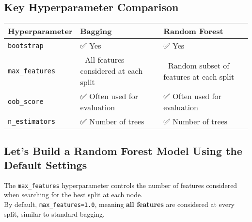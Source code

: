 \documentclass[
  letterpaper,
  DIV=11,
  numbers=noendperiod]{scrreprt}
\begin{document}
\subsection{Key Hyperparameter
Comparison}\label{key-hyperparameter-comparison}

\begin{longtable}[]{@{}
  >{\raggedright\arraybackslash}p{}
  >{\raggedright\arraybackslash}p{}
  >{\raggedright\arraybackslash}p{}@{}}
\toprule\noalign{}
\begin{minipage}[b]{\linewidth}\raggedright
Hyperparameter
\end{minipage} & \begin{minipage}[b]{\linewidth}\raggedright
\textbf{Bagging}
\end{minipage} & \begin{minipage}[b]{\linewidth}\raggedright
\textbf{Random Forest}
\end{minipage} \\
\midrule\noalign{}
\endhead
\bottomrule\noalign{}
\endlastfoot
\texttt{bootstrap} & ✅ Yes & ✅ Yes \\
\texttt{max\_features} & 🧩 All features considered at each split & 🧩
Random subset of features at each split \\
\texttt{oob\_score} & ✅ Often used for evaluation & ✅ Often used for
evaluation \\
\texttt{n\_estimators} & ✅ Number of trees & ✅ Number of trees \\
\end{longtable}

\subsection{Let's Build a Random Forest Model Using the Default
Settings}\label{lets-build-a-random-forest-model-using-the-default-settings}

The \texttt{max\_features} hyperparameter controls the number of
features considered when searching for the best split at each node.\\
By default, \texttt{max\_features=1.0}, meaning \textbf{all features}
are considered at every split, similar to standard bagging.
\end{document}
